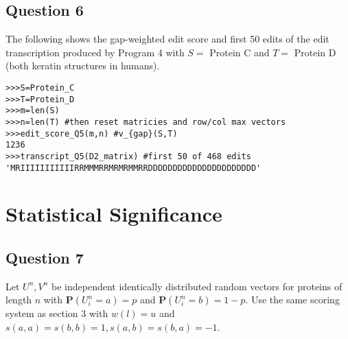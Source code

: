 \documentclass{article}
\begin{document}
\subsection{Question 6}
\vspace{-0.3cm}
The following shows the gap-weighted edit score and first 50 edits of the edit transcription produced by Program 4 with $S=$ Protein C and $T=$ Protein D (both keratin structures in humans). 

\begin{lstlisting}
>>>S=Protein_C
>>>T=Protein_D
>>>m=len(S)
>>>n=len(T) #then reset matricies and row/col max vectors
>>>edit_score_Q5(m,n) #v_{gap}(S,T)
1236
>>>transcript_Q5(D2_matrix) #first 50 of 468 edits
'MRIIIIIIIIIIIRRMMMRRMRMRMMRRDDDDDDDDDDDDDDDDDDDDDD'
\end{lstlisting}

\vspace{-0.5cm}
\section{Statistical Significance}
\vspace{-0.3cm}
\subsection{Question 7}
\vspace{-0.4cm}
Let $U^n,V^n$ be independent identically distributed random vectors for proteins of length $n$ with $\textbf{P}(U^n_i=a)=p$ and $\textbf{P} (U^n_i=b)=1-p$. Use the same scoring system as section 3 with $w(l)=u$ and $s(a,a)=s(b,b)=1, s(a,b)=s(b,a)=-1$. 
\end{document}
